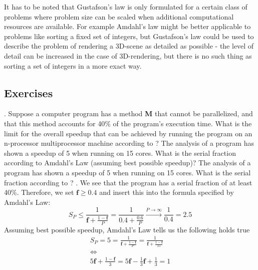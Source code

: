 \documentclass[main.tex]{subfiles}
\begin{document}
It has to be noted that Gustafson's law is only formulated for a certain class of problems where problem size can be scaled when additional computational resources are available. For example Amdahl's law might be better applicable to problems like sorting a fixed set of integers, but Gustafson's law could be used to describe the problem of rendering a 3D-scene as detailed as possible - the level of detail can be increased in the case of 3D-rendering, but there is no such thing as sorting a set of integers in a more exact way.

\subsection{Exercises}
\begin{ExerciseList}
    \Exercise[title={Amdahl's Law, Gustafson's Law, Performance},label=AGL].
        \Question Suppose a computer program has a method \textbf{M} that cannot be parallelized, and that this method accounts for 40\% of the program’s execution time. What is the limit for the overall speedup that can be achieved by running the program on an n-processor multiprocessor machine according to ?
        \Question The analysis of a program has shown a speedup of 5 when running on 15 cores. What is the serial fraction according to Amdahl's Law (assuming best possible speedup)?
        \Question The analysis of a program has shown a speedup of 5 when running on 15 cores. What is the serial fraction according to ?
    \Answer[ref={AGL}].
        \Question We see that the program has a serial fraction of at least 40\%. Therefore, we set $\mathbf{f} \geq 0.4$ and insert this into the formula specified by Amdahl's Law:
            \begin{equation*}
                S_P \leq \frac{1}{\mathbf{f} + \frac{1-\mathbf{f}}{P}} = \frac{1}{0.4 + \frac{0.6}{P}} \xrightarrow{P \rightarrow \infty} \frac{1}{0.4} = 2.5
            \end{equation*}
        \Question Assuming best possible speedup, Amdahl's Law tells us the following holds true
            \begin{gather*}
                S_P = 5 = \frac{1}{\mathbf{f}+\frac{1-\mathbf{f}}{P}} = \frac{1}{\mathbf{f}+\frac{1-\mathbf{f}}{15}} \\
                \Longleftrightarrow\\
                5 \mathbf{f} + \frac{1-\mathbf{f}}{3} = 5 \mathbf{f} - \frac{1}{3} \mathbf{f} + \frac{1}{3} = 1\\

\end{gather*}
\end{ExerciseList}
\end{document}
